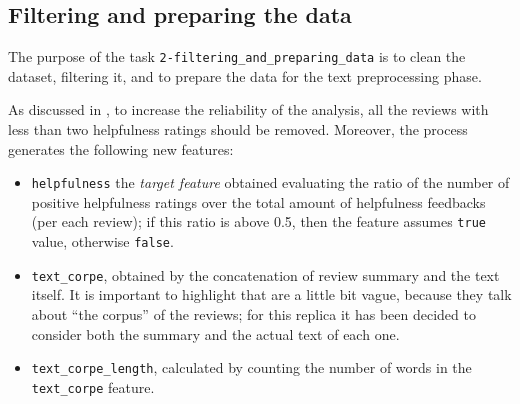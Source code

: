 \documentclass[a4paper]{article}
\begin{document}
		 \subsection{Filtering and preparing the data}
		 	The purpose of the task \verb*|2-filtering_and_preparing_data| is to clean the dataset, filtering it, and to prepare the data for the text preprocessing phase.
		 	
		 	As discussed in \cite{article:muller}, to increase the reliability of the analysis, all the reviews with less than two helpfulness ratings should be removed. Moreover, the process generates the following new features:
		 	\begin{itemize}
		 		\item \verb*|helpfulness| the \emph{target feature} obtained evaluating the ratio of the number of positive helpfulness ratings over the total amount of helpfulness feedbacks (per each review); if this ratio is above 0.5, then the feature assumes \verb*|true| value, otherwise \verb*|false|.
		 		\item \verb*|text_corpe|, obtained by the concatenation of review summary and the text itself. It is important to highlight that \citeauthor{article:muller} are a little bit vague, because they talk about ``the corpus'' of the reviews; for this replica it has been decided to consider both the summary and the actual text of each one.
		 		\item \verb*|text_corpe_length|, calculated by counting the number of words in the \verb*|text_corpe| feature. 
		 	\end{itemize} 
	 	
\end{document}
